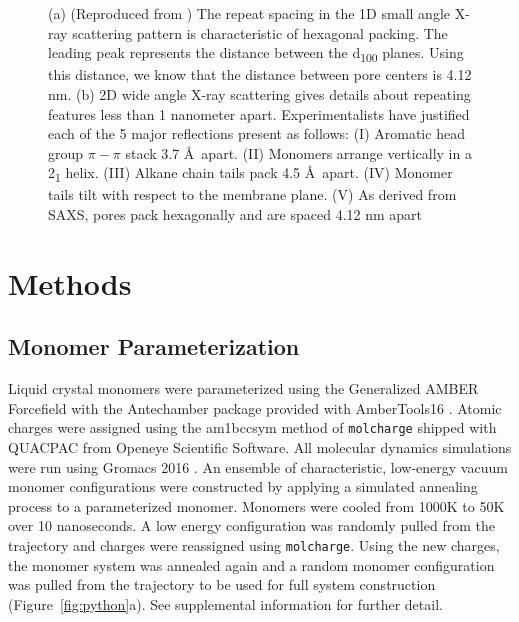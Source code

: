 \documentclass{article}
\begin{document}
\begin{figure}
\begin{subfigure}[t]{0.47\linewidth}
                \caption{}\label{fig:WAXS}
        \end{subfigure}
	\caption{(a) (Reproduced from \cite{feng_thin_2016}) The repeat spacing
		in the 1D small angle X-ray scattering pattern is characteristic of hexagonal
		packing. The leading peak represents the distance between the
		d\textsubscript{100} planes. Using this distance, we know that the distance
		between pore centers is 4.12 nm. (b) 2D wide angle X-ray scattering gives
		details about repeating features less than 1 nanometer apart. Experimentalists
		have justified each of the 5 major reflections present as follows: (I) Aromatic
		head group $\pi-\pi$ stack 3.7 \AA~apart.  (II) Monomers arrange vertically in
		a 2\textsubscript{1} helix. (III) Alkane chain tails pack 4.5 \AA~apart. (IV)
		Monomer tails tilt with respect to the membrane plane. (V) As derived from
		SAXS, pores pack hexagonally and are spaced 4.12 nm apart}
	\label{fig:SWAXS}
 \end{figure}

  \section{Methods}
 
  \subsection{Monomer Parameterization}

  Liquid crystal monomers were parameterized using the Generalized AMBER
  Forcefield \cite{wang_development_2004} with the Antechamber package
  \cite{wang_automatic_2006} provided with AmberTools16
  \cite{case_ambertools16_2016}. Atomic charges were assigned using the am1bccsym
  method of \texttt{molcharge} shipped with QUACPAC from Openeye Scientific
  Software. All molecular dynamics simulations were run using Gromacs 2016
  \cite{bekker_gromacs:_1993,berendsen_gromacs:_1995,van_der_spoel_gromacs:_2005,hess_gromacs_2008}.
  An ensemble of characteristic, low-energy vacuum monomer
  configurations were constructed by applying a simulated annealing process to a
  parameterized monomer. Monomers were cooled from 1000K to 50K over 10
  nanoseconds.  A low energy configuration was randomly pulled from the
  trajectory and charges were reassigned using \texttt{molcharge}.  Using the new
  charges, the monomer system was annealed again and a random monomer
  configuration was pulled from the trajectory to be used for full system
  construction (Figure~\ref{fig:python}a).  See supplemental information for
  further detail.
\end{document}
